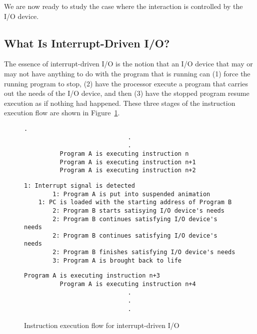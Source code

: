 \documentclass{patt}
\begin{document}
We are now ready to study the case where the interaction is controlled
by the I/O device.

\subsection{What Is Interrupt-Driven I/O?}

The essence of interrupt-driven I/O is the notion that an I/O device
that may or may not have anything to do with the program that is
running can (1) force the running program to stop, (2) have the processor
execute a program that carries
out the needs of the I/O device, and then (3) have the stopped
program resume execution as if nothing had happened.  These three
stages of the instruction execution flow are shown in
Figure~\ref{fig:flow_interrupt_IO}.

\begin{figure}[h!]
\setlength{\topsep}{0pt}
\setlength{\partopsep}{0pt}
\setlength{\parskip}{0pt}
\begin{Verbatim}[fontsize=\fontsize{9}{13}\selectfont]
                             .
                             .
                             .
          Program A is executing instruction n
          Program A is executing instruction n+1
          Program A is executing instruction n+2
\end{Verbatim}
\setlength{\topsep}{0pt}
\setlength{\partopsep}{0pt}
\setlength{\parskip}{0pt}
\begin{Verbatim}[fontsize=\fontsize{9}{11}\selectfont,formatcom=\colour]
        1: Interrupt signal is detected
        1: Program A is put into suspended animation
	1: PC is loaded with the starting address of Program B
        2: Program B starts satisying I/O device's needs 
        2: Program B continues satisfying I/O device's needs
        2: Program B continues satisfying I/O device's needs
        2: Program B finishes satisfying I/O device's needs
        3: Program A is brought back to life
\end{Verbatim}
\setlength{\topsep}{0pt}
\setlength{\partopsep}{0pt}
\setlength{\parskip}{0pt}
\begin{Verbatim}[fontsize=\fontsize{9}{11}\selectfont]
          Program A is executing instruction n+3
          Program A is executing instruction n+4
                             .
                             .
                             .
\end{Verbatim}
\caption{Instruction execution flow for interrupt-driven I/O}
\label{fig:flow_interrupt_IO}
\end{figure}
\end{document}
